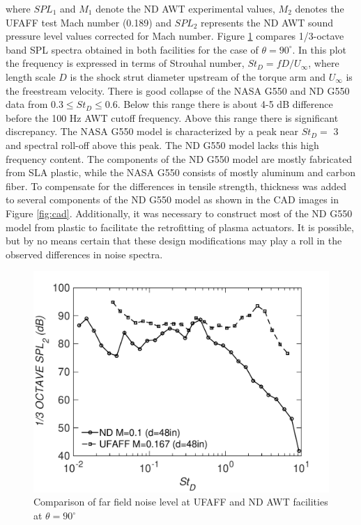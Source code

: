 where $SPL_1$ and $M_1$ denote the ND AWT experimental values, $M_2$ denotes the UFAFF test Mach number (0.189) and $SPL_2$ represents the ND AWT sound pressure level values corrected for Mach number. Figure \ref{fig:farfield} compares 1/3-octave band SPL spectra obtained in both facilities for the case of $\theta = 90^\circ$. In this plot the frequency is expressed in terms of Strouhal number, $St_D = f D / U_\infty$, where length scale $D$ is the shock strut diameter upstream of the torque arm and $U_\infty$ is the freestream velocity.
There is good collapse of the NASA G550 and ND G550 data from $0.3 \leq St_D \leq 0.6$. Below this range there is about 4-5 dB difference before the 100 Hz AWT cutoff frequency. Above this range there is significant discrepancy. The NASA G550 model is characterized by a peak near $St_D=$ 3 and spectral roll-off above this peak. The ND G550 model lacks this high frequency content. The components of the ND G550 model are mostly fabricated from SLA plastic, while the NASA G550 consists of mostly aluminum and carbon fiber. To compensate for the differences in tensile strength, thickness was added to several components of the ND G550 model as shown in the CAD images in Figure \ref{fig:cad}. Additionally, it was necessary to construct most of the ND G550 model from plastic to facilitate the retrofitting of plasma actuators. It is possible, but by no means certain that these design modifications may play a roll in the observed differences in noise spectra.

\begin{figure}
	\begin{center}
		\centerline{\includegraphics[scale=0.7]{figures/nd_ufaff}}
		\caption{Comparison of far field noise level at UFAFF and ND AWT facilities at $\theta = 90^\circ$}
		\label{fig:farfield}
	\end{center}
\end{figure}

